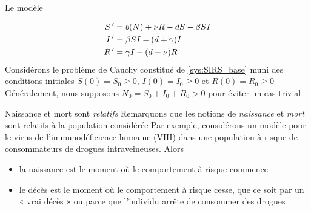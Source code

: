 \documentclass[aspectratio=169]{beamer}\usepackage[]{graphicx}\usepackage[]{xcolor}
\begin{document}
\begin{frame}[fragile]{Le modèle}
\begin{minipage}{0.25\textwidth}
  \def\skip{*-1.5}
\end{minipage}
\begin{minipage}{0.7\textwidth}
  \begin{subequations} \label{sys:SIRS_base}
  \begin{align}
    S\,' &= b(N)+\nu R-dS-\beta SI \label{sys:SIRS_base_dS} \\
    I\,' &= \beta SI-(d+\gamma) I \label{sys:SIRS_base_dI} \\
    R\,' &= \gamma I-(d+\nu)R \label{sys:SIRS_base_dR}
  \end{align}    
  \end{subequations}
  \vskip1cm
  Considérons le problème de Cauchy constitué de \eqref{sys:SIRS_base} muni des conditions initiales $S(0)=S_0\geq 0$, $I(0)=I_0\geq 0$ et $R(0)=R_0\geq 0$
  \vskip1cm
  Généralement, nous supposons $N_0=S_0+I_0+R_0>0$ pour éviter un cas trivial
  \end{minipage}
\end{frame}

\begin{frame}{Naissance et mort sont \emph{relatifs}}
  Remarquons que les notions de \emph{naissance} et \emph{mort} sont relatifs à la population considérée
  \vfill
  Par exemple, considérons un modèle pour le virus de l'immunodéficience humaine (VIH) dans une population à risque de consommateurs de drogues intraveineuses. Alors
  \begin{itemize}
    \item la naissance est le moment où le comportement à risque commence
    \item le décès est le moment où le comportement à risque cesse, que ce soit par un « vrai décès » ou parce que l'individu arrête de consommer des drogues
  \end{itemize}
\end{frame}
\end{document}
